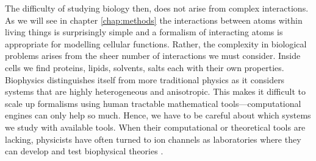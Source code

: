The difficulty of studying biology then, does not arise from complex interactions. As we will see in chapter \ref{chap:methods} the interactions between atoms within living things is surprisingly simple and a formalism of interacting atoms is appropriate for modelling cellular functions. Rather, the complexity in biological problems arises from the sheer number of interactions we must consider. Inside cells we find proteins, lipids, solvents, salts each with their own properties. Biophysics distinguishes itself from more traditional physics as it considers systems that are highly heterogeneous and anisotropic. This makes it difficult to scale up formalisms using human tractable mathematical tools---computational engines can only help so much. Hence, we have to be careful about which systems we study with available tools. When their computational or theoretical tools are lacking, physicists have often turned to ion channels as laboratories where they can develop and test biophysical theories \cite{moy2000, corry2000}.






